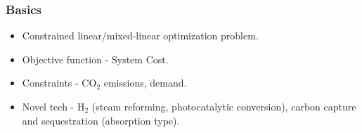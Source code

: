 \begin{frame}
  \frametitle{Basics}
        \begin{itemize}
        
        \item Constrained linear/mixed-linear optimization problem.
        
        \item Objective function - System Cost.
        
        \item Constraints - CO$_2$ emissions, demand.
        
        \item Novel tech - H$_2$ (steam reforming, photocatalytic conversion), carbon capture and sequestration (absorption type).
        
        \end{itemize}
\end{frame}
